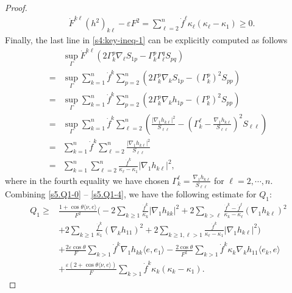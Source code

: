 \documentclass[11pt,reqno]{amsart}
\theoremstyle{definition}
\theoremstyle{remark}
\numberwithin{equation}{section}
\renewcommand{\(}{\left(}
\renewcommand{\)}{\right)}
\renewcommand{\-}{\overline}
\newcommand{\e}{\varepsilon}
\renewcommand{\k}{\kappa}
\renewcommand{\t}{\theta}
\newcommand{\G}{\Gamma}
\begin{document}
\begin{proof}
\begin{align}
      &\dot{F}^{k\ell}(h^2)_{k\ell}-   \varepsilon  F^2= \sum_{\ell=2}^{n}\dot{f}^\ell\kappa_\ell(\kappa_\ell-\kappa_1)\geq 0.
    \end{align}
    Finally, the last line in \eqref{s4:key-ineq-1} can be explicitly computed as follows
    \begin{align}\label{s5.Q1-4}
    &\sup_\Gamma\dot{F}^{k\ell}(2\G_k^p\nabla_\ell S_{1p}-\G_k^p\G_\ell^q S_{pq})\nonumber\\
    =&\sup_\Gamma\sum_{k=1}^n\dot{f}^{k}\sum_{p=2}^{n}\left(2\G^p_k\nabla_k S_{1p}-(\G_k^p)^2S_{pp}\right)\nonumber\\
        =&\sup_\Gamma\sum_{k=1}^n\dot{f}^{k}\sum_{p=2}^{n}\left(2\G^p_k\nabla_k h_{1p}-(\G_k^p)^2S_{pp}\right)\nonumber\\
      =&\sup_\Gamma\sum_{k=1}^n\dot{f}^{k}\sum_{\ell=2}^{n}\(\frac{|\nabla_1 h_{k\ell}|^2}{S_{\ell\ell}}-\(\G_k^\ell-\frac{\nabla_1 h_{k\ell}}{S_{\ell\ell}}\)^2S_{\ell\ell}\)\nonumber\\
   = &\sum_{k=1}^n\dot{f}^{k}\sum_{\ell=2}^{n}\frac{|\nabla_1 h_{k\ell}|^2}{S_{\ell\ell}}\nonumber\\
   =&\sum_{k=1}^n\sum_{\ell=2}^{n}\frac{\dot{f}^{k}}{\kappa_{\ell}-\kappa_1}|\nabla_1 h_{k\ell}|^2,
    \end{align}
    where in the fourth equality we have chosen $\G_k^\ell=\frac{\nabla_1 h_{k\ell}}{S_{\ell\ell}}$ for $\ell=2,\cdots,n$.  Combining \eqref{s5.Q1-0} -- \eqref{s5.Q1-4},  we have the following estimate for $Q_1$:
    \begin{align}\label{s5.Q2}
     Q_1\geq &\frac{1+\cos\t\langle \nu,e\rangle}{F^2}\biggl( -2 \sum_{k\geq 1}\frac{\dot{f}^k}{\k_k}|\nabla_1 h_{kk}|^2+2\sum_{k>\ell}\frac{\dot{f}^k-\dot{f}^\ell}{\kappa_k-\kappa_\ell}(\nabla_1h_{k\ell})^2\nonumber\\
     &+2\sum_{k\geq 1}\frac{\dot{f}^k}{\kappa_1}(\nabla_kh_{11})^2+2\sum_{k\geq 1,\ell>1}\frac{\dot{f}^{k}}{\kappa_{\ell}-\kappa_1}|\nabla_1 h_{k\ell}|^2\biggr)\nonumber\\
    &+\frac{2\varepsilon\cos\t}{F}\sum_{k>1}\dot{f}^k\nabla_1h_{kk} \langle e,e_1\rangle-\frac{2\cos\t}{F^2}\sum_{k>1}\dot{f}^{k}\kappa_k\nabla_kh_{11}\langle e_k,e\rangle \nonumber\\
    &+\frac{\e(2+\cos\t\langle \nu,e\rangle)}{F}\sum_{k>1}\dot{f}^k\kappa_k(\kappa_k-\kappa_1).
    \end{align}


\end{proof}
\end{document}
